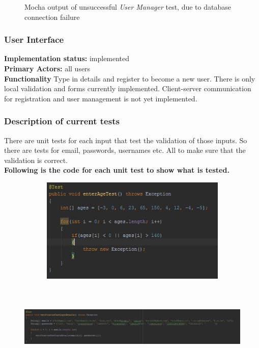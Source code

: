 \documentclass[12pt]{article}
\begin{document}
{\begin{center}
\begin{figure}[h!]
		\caption{Mocha output of unsuccessful \textit{User Manager} test, due to database connection failure}
	\end{figure}
	\end{center}

\pagebreak

	\subsubsection{User Interface}
	\textbf{Implementation status:} implemented \\
	\textbf{Primary Actors:} all users \\
	\textbf{Functionality} Type in details and register to become a new user. There is only local validation and forms currently implemented. Client-server communication for registration and user management is not yet implemented.
	\subsubsection{Description of current tests}
	There are unit tests for each input that test the validation of those inputs. So there are tests for email, passwords, usernames etc. All to make sure that the validation is correct. \\
	\textbf{Following is the code for each unit test to show what is tested.}
	\begin{center}
	\begin{figure}[h]
		\includegraphics[width=15cm, height=5cm]{tests/usrUI/TestAge.JPG}
	\end{figure}

	\begin{figure}[h]
		\includegraphics[width=15cm, height=4cm]{tests/usrUI/TestLogin.JPG}
	\end{figure}


\end{center}}
\end{document}
